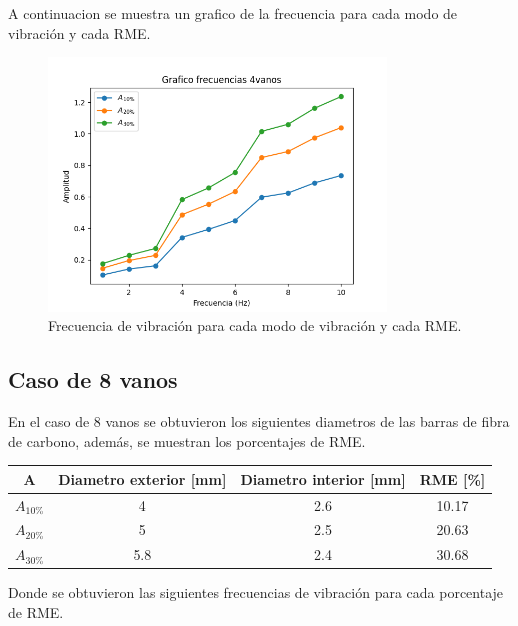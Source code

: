 A continuacion se muestra un grafico de la frecuencia para cada modo de vibración y cada RME. 

\begin{figure}[H]
    \centering
    \includegraphics[width=0.8\textwidth]{../grafico_frecuencias_4vanos.png}
    \caption{Frecuencia de vibración para cada modo de vibración y cada RME.}
\end{figure}

\subsection{Caso de 8 vanos}
En el caso de 8 vanos se obtuvieron los siguientes diametros de las barras de fibra de carbono, además, se muestran los porcentajes de RME.

\begin{table}[H]
    \centering
    \begin{tabular}{cccc}
    \toprule
     A & Diametro exterior [mm] & Diametro interior [mm] & RME [\%] \\
    \midrule
     $A_{10\%}$ &  4 &  2.6 &  10.17 \\
     $A_{20\%}$ &  5 &  2.5 &  20.63 \\
     $A_{30\%}$ &  5.8 &  2.4 &  30.68 \\
    \bottomrule
    \end{tabular}
\end{table}

Donde se obtuvieron las siguientes frecuencias de vibración para cada porcentaje de RME.

